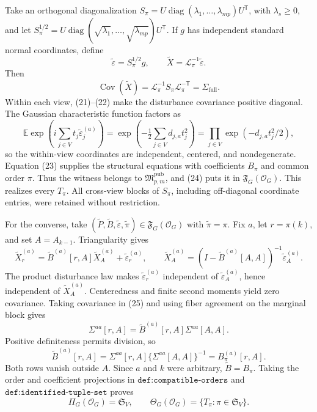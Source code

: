 Take an orthogonal diagonalization \(S_\pi=U\operatorname{diag}(\lambda_1,\ldots,\lambda_{mp})U^{\mathsf T}\), with \(\lambda_s\ge0\), and let \(S_\pi^{1/2}=U\operatorname{diag}(\sqrt{\lambda_1},\ldots,\sqrt{\lambda_{mp}})U^{\mathsf T}\).  If \(g\) has independent standard normal coordinates, define
\[
 \widetilde\varepsilon=S_\pi^{1/2}g,
 \qquad \widetilde X=\mathcal L_\pi^{-1}\widetilde\varepsilon.
 \tag{23}
\]
Then
\[
 \operatorname{Cov}(\widetilde X)
 =\mathcal L_\pi^{-1}S_\pi\mathcal L_\pi^{-\mathsf T}
 =\Sigma_{\mathrm{full}}.
 \tag{24}
\]
Within each view, (21)--(22) make the disturbance covariance positive diagonal.  The Gaussian characteristic function factors as
\[
 \mathbb E\exp\!\left(i\sum_{j\in V}t_j\widetilde\varepsilon_j^{(a)}\right)
 =\exp\!\left(-\tfrac12\sum_{j\in V}d_{j,a}t_j^2\right)
 =\prod_{j\in V}\exp(-d_{j,a}t_j^2/2),
\]
so the within-view coordinates are independent, centered, and nondegenerate.  Equation (23) supplies the structural equations with coefficients \(B_\pi\) and common order \(\pi\).  Thus the witness belongs to \(\mathfrak M_{p,m}^{\mathrm{pub}}\), and (24) puts it in \(\mathfrak F_G(\mathcal O_G)\).  This realizes every \(T_\pi\).  All cross-view blocks of \(S_\pi\), including off-diagonal coordinate entries, were retained without restriction.

For the converse, take \((\widetilde P,\widetilde B,\widetilde\varepsilon,\widetilde\pi)\in\mathfrak F_G(\mathcal O_G)\) with \(\widetilde\pi=\pi\).  Fix \(a\), let \(r=\pi(k)\), and set \(A=A_{k-1}\).  Triangularity gives
\[
 \widetilde X_r^{(a)}
 =\widetilde B^{(a)}[r,A]\widetilde X_A^{(a)}
 +\widetilde\varepsilon_r^{(a)},
 \qquad
 \widetilde X_A^{(a)}
 =(I-\widetilde B^{(a)}[A,A])^{-1}
 \widetilde\varepsilon_A^{(a)}.
 \tag{25}
\]
The product disturbance law makes \(\widetilde\varepsilon_r^{(a)}\) independent of \(\widetilde\varepsilon_A^{(a)}\), hence independent of \(\widetilde X_A^{(a)}\).  Centeredness and finite second moments yield zero covariance.  Taking covariance in (25) and using fiber agreement on the marginal block gives
\[
 \Sigma^{aa}[r,A]
 =\widetilde B^{(a)}[r,A]\Sigma^{aa}[A,A].
\]
Positive definiteness permits division, so
\[
 \widetilde B^{(a)}[r,A]
 =\Sigma^{aa}[r,A]\{\Sigma^{aa}[A,A]\}^{-1}
 =B_\pi^{(a)}[r,A].
 \tag{26}
\]
Both rows vanish outside \(A\).  Since \(a\) and \(k\) were arbitrary, \(\widetilde B=B_\pi\).  Taking the order and coefficient projections in \(\texttt{def:compatible-orders}\) and \(\texttt{def:identified-tuple-set}\) proves
\[
 \Pi_G(\mathcal O_G)=\mathfrak S_V,
 \qquad \Theta_G(\mathcal O_G)=\{T_\pi:\pi\in\mathfrak S_V\}.
\]

